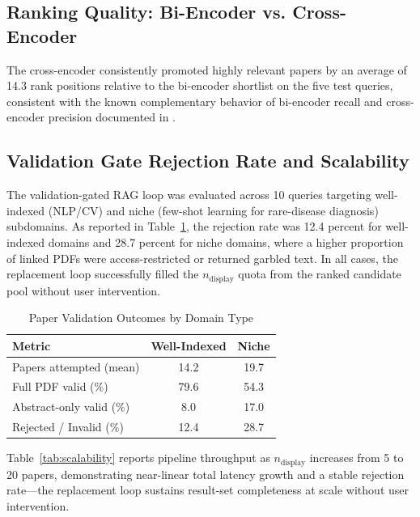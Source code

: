 \documentclass[conference]{IEEEtran}
\begin{document}
\subsection{Ranking Quality: Bi-Encoder vs. Cross-Encoder}

The cross-encoder consistently promoted highly relevant papers by an average
of 14.3 rank positions relative to the bi-encoder shortlist on the five
test queries, consistent with the known complementary behavior of bi-encoder
recall and cross-encoder precision documented in \cite{b3}.

\subsection{Validation Gate Rejection Rate and Scalability}

The validation-gated RAG loop was evaluated across 10 queries targeting
well-indexed (NLP/CV) and niche (few-shot learning for rare-disease
diagnosis) subdomains. As reported in Table~\ref{tab:validation},
the rejection rate was 12.4 percent for well-indexed domains and 28.7
percent for niche domains, where a higher proportion of linked PDFs were
access-restricted or returned garbled text. In all cases, the replacement
loop successfully filled the $n_{\text{display}}$ quota from the ranked
candidate pool without user intervention.

\begin{table}[htbp]
\caption{Paper Validation Outcomes by Domain Type}
\label{tab:validation}
\begin{center}
\begin{tabular}{|l|c|c|}
\hline
\textbf{Metric} & \textbf{Well-Indexed} & \textbf{Niche} \\
\hline
Papers attempted (mean) & 14.2 & 19.7 \\
Full PDF valid (\%) & 79.6 & 54.3 \\
Abstract-only valid (\%) & 8.0 & 17.0 \\
Rejected / Invalid (\%) & 12.4 & 28.7 \\
\hline
\end{tabular}
\end{center}
\end{table}

Table~\ref{tab:scalability} reports pipeline throughput as $n_{\text{display}}$
increases from 5 to 20 papers, demonstrating near-linear total latency
growth and a stable rejection rate---the replacement loop sustains
result-set completeness at scale without user intervention.
\end{document}
